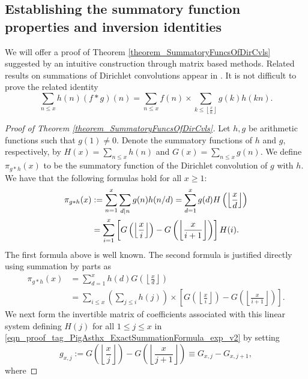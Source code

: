 \documentclass[11pt,reqno,a4letter]{article}
\numberwithin{figure}{section}
\numberwithin{table}{section}
\newcommand{\cf}{\textit{cf.\ }}
\newcommand{\floor}[1]{\left\lfloor #1 \right\rfloor}
\newcommand{\Floor}[2]{\ensuremath{\left\lfloor \frac{#1}{#2} \right\rfloor}}
\theoremstyle{plain}
\numberwithin{theorem}{section}
\theoremstyle{definition}
\begin{document}
\subsection{Establishing the summatory function properties and inversion identities} 

We will offer a proof of Theorem \ref{theorem_SummatoryFuncsOfDirCvls} 
suggested by an intuitive construction through matrix based methods. 
Related results on summations of Dirichlet convolutions appear in 
\cite[\S 2.14; \S 3.10; \S 3.12; \cf \S 4.9, p.\ 95]{APOSTOLANUMT}. 
It is not difficult to prove the related identity 
\[
\sum_{n \leq x} h(n) (f \ast g)(n) = 
     \sum_{n \leq x} f(n) \times \sum_{k \leq \Floor{x}{n}} g(k) h(kn). 
\]

\begin{proof}[Proof of Theorem \ref{theorem_SummatoryFuncsOfDirCvls}] 
\label{proofOf_theorem_SummatoryFuncsOfDirCvls} 
Let $h,g$ be arithmetic functions such that $g(1) \neq 0$. 
Denote the summatory functions of $h$ and $g$, 
respectively, by $H(x) = \sum_{n \leq x} h(n)$ and $G(x) = \sum_{n \leq x} g(n)$. 
We define $\pi_{g \ast h}(x)$ to be the summatory function of the 
Dirichlet convolution of $g$ with $h$. 
We have that the following formulas hold for all $x \geq 1$: 
\begin{align} 
\notag 
\pi_{g \ast h}(x) & := \sum_{n=1}^{x} \sum_{d|n} g(n) h(n/d) = \sum_{d=1}^x g(d) H\left(\floor{\frac{x}{d}}\right) \\ 
\label{eqn_proof_tag_PigAsthx_ExactSummationFormula_exp_v2} 
     & = \sum_{i=1}^x \left[G\left(\floor{\frac{x}{i}}\right) - G\left(\floor{\frac{x}{i+1}}\right)\right] H(i). 
\end{align} 
The first formula above is well known. The second formula is justified directly using 
summation by parts as \cite[\S 2.10(ii)]{NISTHB} 
\begin{align*} 
\pi_{g \ast h}(x) & = \sum_{d=1}^x h(d) G\left(\floor{\frac{x}{d}}\right) \\ 
     & = \sum_{i \leq x} \left(\sum_{j \leq i} h(j)\right) \times 
     \left[G\left(\floor{\frac{x}{i}}\right) - 
     G\left(\floor{\frac{x}{i+1}}\right)\right]. 
\end{align*} 
We next form the invertible matrix of coefficients associated with this linear system defining $H(j)$ for all 
$1 \leq j \leq x$ in \eqref{eqn_proof_tag_PigAsthx_ExactSummationFormula_exp_v2} by setting 
\[
g_{x,j} := G\left(\floor{\frac{x}{j}}\right) - G\left(\floor{\frac{x}{j+1}}\right) \equiv G_{x,j} - G_{x,j+1}, 
\] 
where 

\end{proof}
\end{document}
